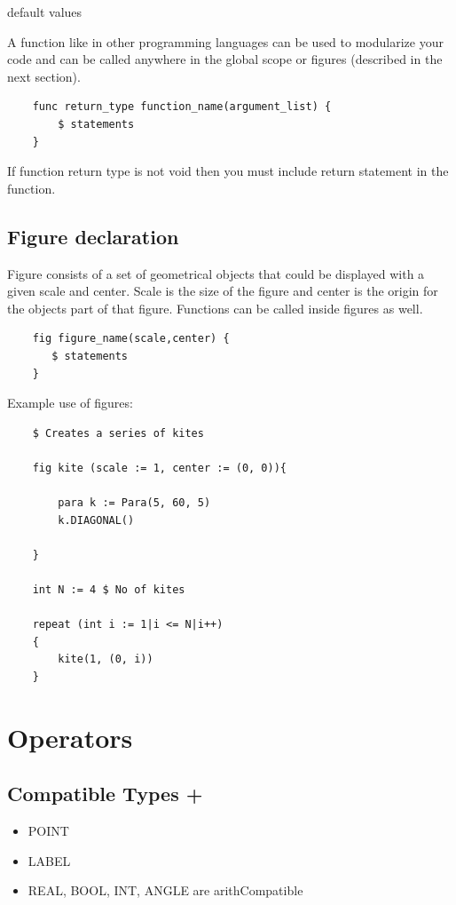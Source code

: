 \documentclass[12pt]{article}
\begin{document}
default values

A function like in other programming languages can be used to modularize your code and can be called anywhere in the global scope or figures (described in the next section).
\begin{verbatim}
    func return_type function_name(argument_list) {
        $ statements
    }
\end{verbatim}
If function return type is not void then you must include return statement in the function.
\subsection{Figure declaration}
Figure consists of a set of geometrical objects that could be displayed with a given scale and center. Scale is the size of the figure and center is the origin for the objects part of that figure. Functions can be called inside figures as well.
\begin{verbatim}
    fig figure_name(scale,center) {
       $ statements
    }
\end{verbatim}
Example use of figures:
\begin{verbatim}
    $ Creates a series of kites
    
    fig kite (scale := 1, center := (0, 0)){

        para k := Para(5, 60, 5)
        k.DIAGONAL()
        
    }

    int N := 4 $ No of kites
    
    repeat (int i := 1|i <= N|i++)
    {
        kite(1, (0, i))
    }
\end{verbatim}


\section{Operators}
\subsection{Compatible Types +}
\begin{itemize}
    \item POINT
    \item LABEL
    \item REAL, BOOL, INT, ANGLE are arithCompatible
\end{itemize}
\end{document}
